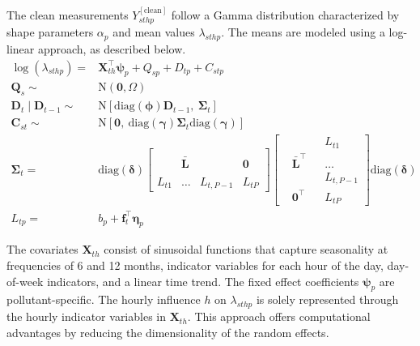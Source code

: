 \documentclass[
  12,
]{article}
\begin{document}
The clean measurements \(Y_{sthp}^{[\mbox{clean}]}\) follow a Gamma
distribution characterized by shape parameters \(\alpha_p\) and mean
values \(\lambda_{sthp}\). The means are modeled using a log-linear
approach, as described below. 
\begin{equation}\label{eqnPollutionhour2}
	\begin{aligned}
		\log{(\lambda_{sthp})}  = & \mathbf{X}_{th}^{\top}\mathbf{\psi}_{p} +Q_{sp}+ D_{tp} + C_{stp}\\
		\mathbf{Q}_{s} \sim & \mbox{N}\left(\mathbf{0}, \Omega \right)\\
		\mathbf{D}_{t}  \mid \mathbf{D}_{t-1}   \sim & \mbox{N}\left[\mbox{diag}(\mathbf{\phi})  \mathbf{D}_{t-1} ,\ \mathbf{\Sigma}_t \right]\\
		\mathbf{C}_{st} \sim & \mbox{N}\left[\mathbf{0},\ \mbox{diag}(\mathbf{\gamma}) \mathbf{\Sigma}_t \mbox{diag}(\mathbf{\gamma}) \right] \\
		\mathbf{\Sigma}_t  = &  \mbox{diag}(\mathbf{\delta}) \left[
		\begin{array}{cccc}
			&  &  &  \\
			& \mathbf{\bar{L}}  &   &  {\mathbf{0}}  \\ 
			&  &  &  \\
			L_{t1} & \dots & L_{t,P-1}  &  L_{tP}
		\end{array}\right] \left[
		\begin{array}{cccc} 
			&  &  &  L_{t1} \\
			& \mathbf{\bar{L}}^{\top}  &   &  \dots  \\ 
			&  &  & L_{t,P-1} \\
			& {\mathbf{0}}^{\top} &   &  L_{tP}
		\end{array}\right] \mbox{diag}(\mathbf{\delta}) \\
		L_{tp}  = &  b_p + \mathbf{f}_t ^{\top}\mathbf{\eta}_p
	\end{aligned}
\end{equation}


The covariates \(\mathbf{X}_{th}\) consist of sinusoidal functions that
capture seasonality at frequencies of 6 and 12 months, indicator
variables for each hour of the day, day-of-week indicators, and a linear
time trend. The fixed effect coefficients \(\mathbf{\psi}_p\) are
pollutant-specific. The hourly influence \(h\) on \(\lambda_{sthp}\) is
solely represented through the hourly indicator variables in
\(\mathbf{X}_{th}\). This approach offers computational advantages by
reducing the dimensionality of the random effects.
\end{document}
